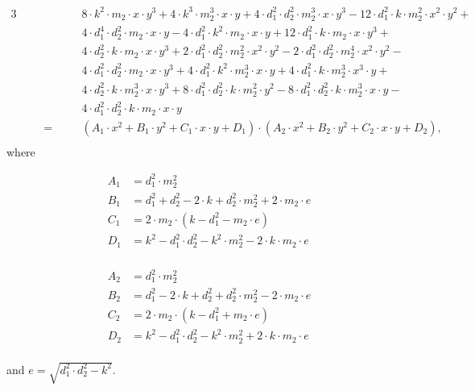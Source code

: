 \begin{alignat*}{3}
  & && && 8 \cdot k^2 \cdot m_2 \cdot x \cdot y^3
    + 4 \cdot k^3 \cdot m_2^3 \cdot x \cdot y
    + 4 \cdot d_1^2 \cdot d_2^2 \cdot m_2^3 \cdot x \cdot y^3
    - 12 \cdot d_1^2 \cdot k \cdot m_2^2 \cdot x^2 \cdot y^2 +\\
  & && && 4 \cdot d_1^4 \cdot d_2^2 \cdot m_2 \cdot x \cdot y
    - 4 \cdot d_1^2 \cdot k^2 \cdot m_2 \cdot x \cdot y
    + 12 \cdot d_1^2 \cdot k \cdot m_2 \cdot x \cdot y^3 +\\
  & && && 4 \cdot d_2^2 \cdot k \cdot m_2 \cdot x \cdot y^3
    + 2 \cdot d_1^2 \cdot d_2^2 \cdot m_2^2 \cdot x^2 \cdot y^2
    - 2 \cdot d_1^2 \cdot d_2^2 \cdot m_2^4 \cdot x^2 \cdot y^2 -\\
  & && && 4 \cdot d_1^2 \cdot d_2^2 \cdot m_2 \cdot x \cdot y^3
    + 4 \cdot d_1^2 \cdot k^2 \cdot m_2^3 \cdot x \cdot y
    + 4 \cdot d_1^2 \cdot k \cdot m_2^3 \cdot x^3 \cdot y +\\
  & && && 4 \cdot d_2^2 \cdot k \cdot m_2^3 \cdot x \cdot y^3
    + 8 \cdot d_1^2 \cdot d_2^2 \cdot k \cdot m_2^2 \cdot y^2
    - 8 \cdot d_1^2 \cdot d_2^2 \cdot k \cdot m_2^3 \cdot x \cdot y -\\
  & && && 4 \cdot d_1^2 \cdot d_2^2 \cdot k \cdot m_2 \cdot x \cdot y\\
  & && =\quad && (A_1\cdot x^2 + B_1\cdot y^2 + C_1\cdot x \cdot y + D_1)\cdot
    (A_2\cdot x^2 + B_2\cdot y^2 + C_2\cdot x \cdot y + D_2),\\
  \end{alignat*}
%
where\\
\begin{minipage}[c]{0.5\textwidth}
\begin{align*}
  A_1 &= d_1^2\cdot m_2^2\\
  B_1 &= d_1^2+d_2^2-2\cdot k+d_2^2\cdot m_2^2+2\cdot m_2\cdot e\\
  C_1 &= 2\cdot m_2\cdot (k - d_1^2 - m_2\cdot e)\\
  D_1 &= k^2 - d_1^2\cdot d_2^2 - k^2\cdot m_2^2 - 2\cdot k\cdot m_2\cdot e\\
\end{align*}
\end{minipage}
%
\begin{minipage}[c]{0.5\textwidth}
\begin{align*}
  A_2 &= d_1^2\cdot m_2^2\\
  B_2 &= d_1^2 - 2\cdot k + d_2^2 + d_2^2\cdot m_2^2 - 2\cdot m_2\cdot  e\\
  C_2 &= 2\cdot m_2\cdot (k - d_1^2 + m_2\cdot  e)\\
  D_2 &= k^2 - d_1^2\cdot d_2^2 - k^2\cdot m_2^2 + 2\cdot k\cdot m_2\cdot e\\
\end{align*}
\end{minipage}
and $e = \sqrt{d_1^2\cdot d_2^2 - k^2}$.
